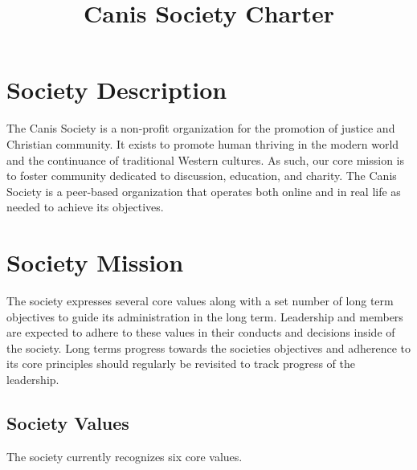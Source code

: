 \documentclass[]{article}
\title{Canis Society Charter}
\begin{document}
\maketitle


\section{Society Description}
\label{sec:description}

The Canis Society is a non-profit organization for the promotion of justice and Christian community. It exists to promote human thriving in the modern world and the continuance of traditional Western cultures. As such, our core mission is to foster community dedicated to discussion, education, and charity. The Canis Society is a peer-based organization that operates both online and in real life as needed to achieve its objectives. 

\clearpage

\section{Society Mission}
\label{sec:values_mission}

The society expresses several core values along with a set number of long term objectives to guide its administration in the long term. Leadership and members are expected to adhere to these values in their conducts and decisions inside of the society. Long terms progress towards the societies objectives and adherence to its core principles should regularly be revisited to track progress of the leadership. 

\subsection{Society Values}
\label{subsec:values}

The society currently recognizes six core values.
\end{document}
